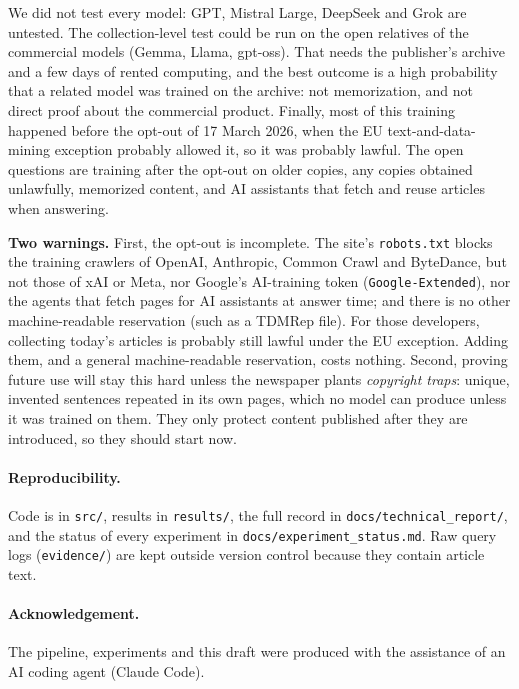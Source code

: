 \documentclass[10pt,a4paper]{article}
\begin{document}
We did not test every model: GPT, Mistral Large, DeepSeek and Grok are untested. The collection-level test could be run on the open relatives of the
commercial models (Gemma, Llama, gpt-oss). That needs the publisher's archive and a few days of rented computing, and
the best outcome is a high probability that a related model was trained on the archive: not memorization, and not
direct proof about the commercial product. Finally, most of this training happened before
the opt-out of 17 March 2026, when the EU text-and-data-mining exception probably allowed it, so it was probably
lawful. The open questions are training after the opt-out on older copies, any copies obtained unlawfully,
memorized content, and AI assistants that fetch and reuse articles when answering.

\textbf{Two warnings.} First, the opt-out is incomplete. The site's \texttt{robots.txt} blocks the training crawlers
of OpenAI, Anthropic, Common Crawl and ByteDance, but not those of xAI or Meta, nor Google's AI-training token
(\texttt{Google-Extended}), nor the agents that fetch pages for AI assistants at answer time; and there is no other
machine-readable reservation (such as a TDMRep file). For those developers, collecting today's articles is probably
still lawful under the EU exception. Adding them, and a general machine-readable reservation, costs nothing.
Second, proving future use will stay this hard unless the newspaper plants \emph{copyright traps}: unique, invented
sentences repeated in its own pages, which no model can produce unless it was trained on them. They only protect
content published after they are introduced, so they should start now.

\paragraph{Reproducibility.} Code is in \texttt{src/}, results in \texttt{results/}, the full record in
\texttt{docs/technical\_report/}, and the status of every experiment in \texttt{docs/experiment\_status.md}. Raw
query logs (\texttt{evidence/}) are kept outside version control because they contain article text.

\paragraph{Acknowledgement.} The pipeline, experiments and this draft were produced with the assistance of an AI
coding agent (Claude Code).
\end{document}
